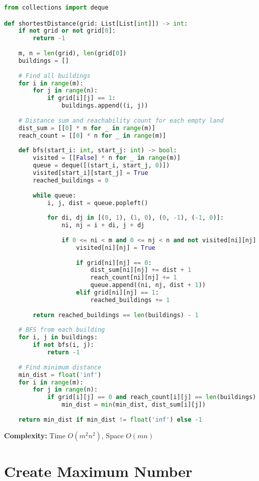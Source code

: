 \documentclass[10pt, a4paper]{article}
\begin{document}
\begin{lstlisting}[language=Python]
from collections import deque

def shortestDistance(grid: List[List[int]]) -> int:
    if not grid or not grid[0]:
        return -1
    
    m, n = len(grid), len(grid[0])
    buildings = []
    
    # Find all buildings
    for i in range(m):
        for j in range(n):
            if grid[i][j] == 1:
                buildings.append((i, j))
    
    # Distance sum and reachability count for each empty land
    dist_sum = [[0] * n for _ in range(m)]
    reach_count = [[0] * n for _ in range(m)]
    
    def bfs(start_i: int, start_j: int) -> bool:
        visited = [[False] * n for _ in range(m)]
        queue = deque([(start_i, start_j, 0)])
        visited[start_i][start_j] = True
        reached_buildings = 0
        
        while queue:
            i, j, dist = queue.popleft()
            
            for di, dj in [(0, 1), (1, 0), (0, -1), (-1, 0)]:
                ni, nj = i + di, j + dj
                
                if 0 <= ni < m and 0 <= nj < n and not visited[ni][nj]:
                    visited[ni][nj] = True
                    
                    if grid[ni][nj] == 0:
                        dist_sum[ni][nj] += dist + 1
                        reach_count[ni][nj] += 1
                        queue.append((ni, nj, dist + 1))
                    elif grid[ni][nj] == 1:
                        reached_buildings += 1
        
        return reached_buildings == len(buildings) - 1
    
    # BFS from each building
    for i, j in buildings:
        if not bfs(i, j):
            return -1
    
    # Find minimum distance
    min_dist = float('inf')
    for i in range(m):
        for j in range(n):
            if grid[i][j] == 0 and reach_count[i][j] == len(buildings):
                min_dist = min(min_dist, dist_sum[i][j])
    
    return min_dist if min_dist != float('inf') else -1
\end{lstlisting}
\textbf{Complexity:} Time $O(m^2n^2)$, Space $O(mn)$

\section{Create Maximum Number}
\end{document}
